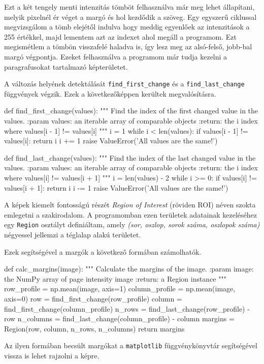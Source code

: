Ezt a két tengely menti intenzitás tömböt felhasználva már meg lehet állapítani, melyik pixelnél ér véget a margó és hol kezdődik a szöveg. Egy egyszerű ciklussal megvizsgálom a tömb elejétől indulva hogy meddig egyenlőek az intenzitások a 255 értékkel, majd lementem azt az indexet ahol megáll a programom. Ezt megismétlem a tömbön visszafelé haladva is, így lesz meg az alsó-felső, jobb-bal margó végpontja. Ezeket felhasználva a programom már tudja kezelni a paragrafusokat tartalmazó képterületet.

A változás helyének detektálását \texttt{find\_first\_change} és a \texttt{find\_last\_change} függvények végzik.
Ezek a következőképpen kerültek megvalósításra.
\begin{python}
def find_first_change(values):
    """
    Find the index of the first changed value in the values.
    :param values: an iterable array of comparable objects
    :return: the i index where values[i - 1] != values[i]
    """
    i = 1
    while i < len(values):
        if values[i - 1] != values[i]:
            return i
        i += 1
    raise ValueError('All values are the same!')
\end{python}

\begin{python}
def find_last_change(values):
    """
    Find the index of the last changed value in the values.
    :param values: an iterable array of comparable objects
    :return: the i index where values[i] != values[i + 1]
    """
    i = len(values) - 2
    while i >= 0:
        if values[i] != values[i + 1]:
            return i
        i -= 1
    raise ValueError('All values are the same!')
\end{python}

A képek kiemelt fontosságú részét \textit{Region of Interest} (röviden ROI) néven szokta emlegetni a szakirodalom. A programomban ezen területek adatainak kezeléséhez egy \texttt{Region} osztályt definiáltam, amely \textit{(sor, oszlop, sorok száma, oszlopok száma)} négyessel jellemzi a téglalap alakú területet.

Ezek segítségével a margók a következő formában számolhatók.
\begin{python}
def calc_margins(image):
    """
    Calculate the margins of the image.
    :param image: the NumPy array of page intensity image
    :return: a Region instance
    """
    row_profile = np.mean(image, axis=1)
    column_profile = np.mean(image, axis=0)
    row = find_first_change(row_profile)
    column = find_first_change(column_profile)
    n_rows = find_last_change(row_profile) - row
    n_columns = find_last_change(column_profile) - column
    margins = Region(row, column, n_rows, n_columns)
    return margins
\end{python}
Az ilyen formában becsült margókat a \texttt{matplotlib} függvénykönyvtár segítségével vissza is lehet rajzolni a képre.

